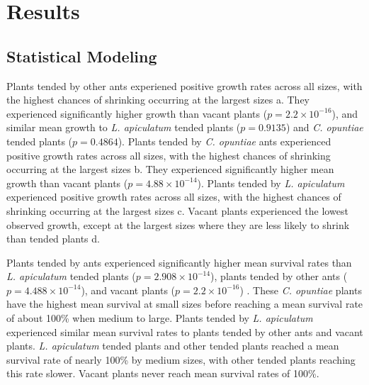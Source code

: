 \documentclass[11pt]{article}
\begin{document}
    
  
\section*{Results}
\subsection*{Statistical Modeling}

Plants tended by other ants experiened positive growth rates across all sizes, with the highest chances of shrinking occurring at the largest sizes \cite{fig:growth}a.
They experienced significantly higher growth than vacant plants ($p = 2.2 \times 10^{-16}$), and similar mean growth to \textit{L. apiculatum} tended plants ($p = 0.9135$) and \textit{C. opuntiae} tended plants ($p = 0.4864$).  
Plants tended by \textit{C. opuntiae} ants experienced positive growth rates across all sizes, with the highest chances of shrinking occurring at the largest sizes \cite{fig:growth}b.
They experienced significantly higher mean growth than vacant plants ($p = 4.88 \times 10^{-14}$).
Plants tended by \textit{L. apiculatum} experienced positive growth rates across all sizes, with the highest chances of shrinking occurring at the largest sizes \cite{fig:growth}c.
Vacant plants experienced the lowest observed growth, except at the largest sizes where they are less likely to shrink than tended plants \cite{fig:growth}d. 

Plants tended by  ants experienced significantly higher mean survival rates than \textit{L. apiculatum} tended plants ($p = 2.908 \times 10^{-14}$), plants tended by other ants ($p = 4.488 \times 10^{-14}$), and vacant plants ($p = 2.2 \times 10^{-16}$) \cite{fig:surv}. 
These \textit{C. opuntiae} plants have the highest mean survival at small sizes before reaching a mean survival rate of about 100\% when medium to large.
Plants tended by \textit{L. apiculatum} experienced similar mean survival rates to plants tended by other ants and vacant plants.
\textit{L. apiculatum} tended plants and other tended plants reached a mean survival rate of nearly 100\% by medium sizes, with other tended plants reaching this rate slower. 
Vacant plants never reach mean survival rates of 100\%. 
\end{document}

